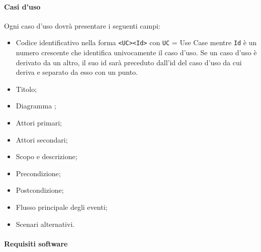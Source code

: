 \documentclass{scalatekids-article}
\begin{document}
\paragraph{Casi d'uso}

Ogni caso d'uso dovrà presentare i seguenti campi:
\begin{itemize}
    \item Codice identificativo nella forma \verb=<UC><Id>= con \verb=UC= = Use
        Case mentre \verb=Id= è un numero crescente che identifica univocamente il
        caso d'uso. Se un caso d'uso è derivato da un altro, il suo id sarà
        preceduto dall'id del caso d'uso da cui deriva e separato da esso con un
        punto.
    \item Titolo;
    \item Diagramma ;
    \item Attori primari;
    \item Attori secondari;
    \item Scopo e descrizione;
    \item Precondizione;
    \item Postcondizione;
    \item Flusso principale degli eventi;
    \item Scenari alternativi.
\end{itemize}

\paragraph{Requisiti software}
\end{document}
